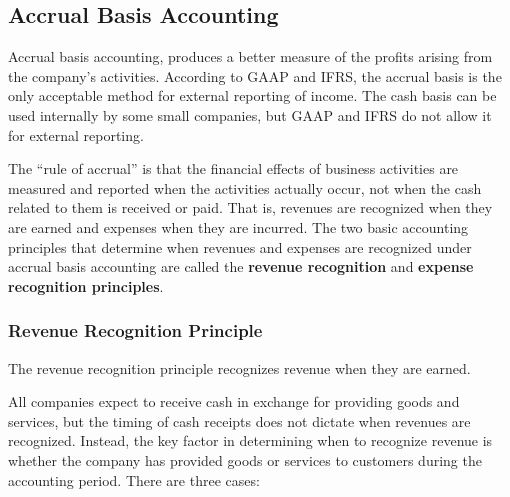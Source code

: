 \documentclass[../main.tex]{subfiles}
\begin{document}
	\subsection{Accrual Basis Accounting}
	
	Accrual basis accounting, produces a better measure of the profits arising 
	from the company’s activities. According to GAAP and IFRS, the accrual 
	basis is the only acceptable method for external reporting of income. The 
	cash basis can be used internally by some small companies, but GAAP and 
	IFRS do not allow it for external reporting.
	
	The “rule of accrual” is that the financial effects of business activities 
	are measured and reported when the activities actually occur, not when the 
	cash related to them is received or paid. That is, revenues are recognized 
	when they are earned and expenses when they are incurred. The two basic 
	accounting principles that determine when revenues and expenses are 
	recognized under accrual basis accounting are called the \textbf{revenue 
	recognition} and \textbf{expense recognition principles}.

	\subsubsection{Revenue Recognition Principle}
	
	The revenue recognition principle recognizes revenue when they are earned. 
	
	All companies expect to receive cash in exchange for providing goods and 
	services, but the timing of cash receipts does not dictate when revenues 
	are recognized. Instead, the key factor in determining when to recognize 
	revenue is whether the company has provided goods or services to customers 
	during the accounting period. There are three cases:
	
\end{document}
